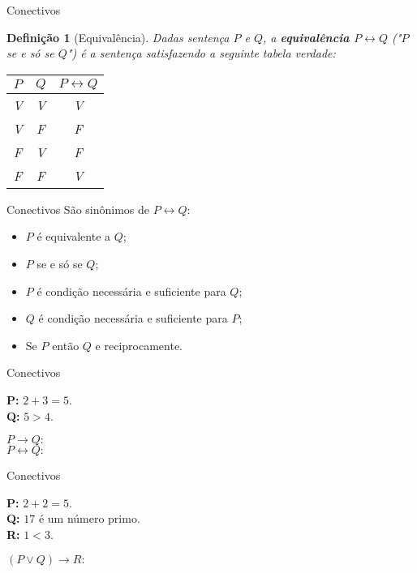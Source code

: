 \documentclass[10pt]{beamer}
\renewcommand{\indent}{\hspace*{2em}}
\theoremstyle{plain}
\newtheorem{defn}{Definição}[section]
\begin{document}
\begin{frame}{Conectivos}
        \begin{defn}[Equivalência]
        \vfill\indent Dadas sentença $P$ e $Q$, a \textbf{equivalência $P\leftrightarrow Q$} ("$P$ se e só se $Q$") é a sentença satisfazendo a seguinte tabela verdade:
        \begin{center}
            \begin{tabular}{|c|c|c|}
    \hline
    $P$ & $Q$  & $P\leftrightarrow Q$\\
    \hline
    V & V & V \\
    \hline
    V & F & F \\
    \hline
    F & V & F \\
    \hline
    F & F & V \\
    \hline
\end{tabular}
        \end{center}
    \end{defn}
\end{frame}

\begin{frame}{Conectivos}
    \indent São sinônimos de $P\leftrightarrow Q$:
    \begin{itemize}
        \item $P$ é equivalente a $Q$;
        \item $P$ se e só se $Q$;
        \item $P$ é condição necessária e suficiente para $Q$;
        \item $Q$ é condição necessária e suficiente para $P$;
        \item Se $P$ então $Q$ e reciprocamente.
    \end{itemize}
\end{frame}

\begin{frame}{Conectivos}
    \begin{block}{}
     \textbf{P:} $2+3=5$. \\
     \textbf{Q:} $5>4$.
    \end{block}
    $$$$
    $P\rightarrow Q:$
    $$$$
    $$$$
    $P\leftrightarrow Q:$
\end{frame}

\begin{frame}{Conectivos}
    \begin{block}{}
     \textbf{P:} $2+2=5$. \\
     \textbf{Q:} $17$ é um número primo. \\
     \textbf{R:} $1<3$.
    \end{block}  
    $$$$
    $(P\vee Q)\rightarrow R:$
\end{frame}
\end{document}
